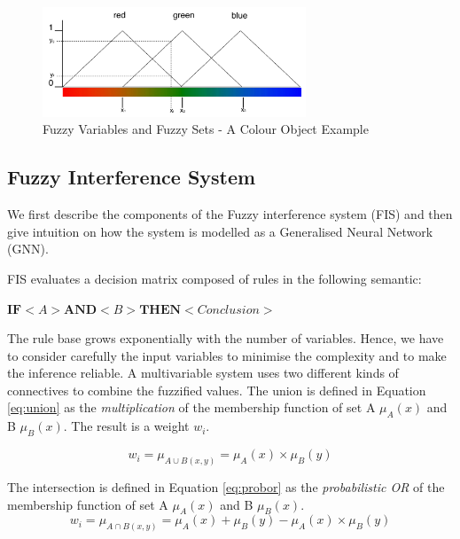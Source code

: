 \begin{figure}[H]
        \centering
         \includegraphics[width=0.7\textwidth ]{img/model/fuzz_example}
              
        \caption{Fuzzy Variables and Fuzzy Sets - A Colour Object Example}
        \label{fig:fuzz_example}
\end{figure}



\subsection{Fuzzy Interference System}

We first describe the components of the Fuzzy interference system (FIS) and then give intuition on how the system is modelled as a Generalised Neural Network (GNN). 

FIS evaluates a decision matrix composed of rules in the following semantic: \\

\centerline {$ \textbf{IF} <  A  > \textbf{AND} <  B  > \textbf{THEN} < Conclusion > $}

The rule base grows exponentially with the number of variables. Hence, we have to consider carefully the input variables to minimise the complexity and to make the inference reliable. A multivariable system uses two different kinds of connectives to combine the fuzzified values. The union is defined in Equation \ref{eq:union} as the \emph{multiplication} of the membership function of set A $\mu_A(x)$ and B $\mu_B(x).$ The result is a weight $w_i$.


 \begin{equation} \label{eq:union}
 w_i =  \mu_{A\cup B(x,y)} =   \mu_A (x) \times \mu_B(y)
 \end{equation}

The intersection is defined in Equation \ref{eq:probor} as the \emph{probabilistic OR} of the membership function of set A $\mu_A(x)$ and B $\mu_B(x).$ 
\begin{equation} \label{eq:probor}
 w_i =  \mu_{A\cap B(x,y)} =   \mu_A (x)  + \mu_B(y) -  \mu_A (x)  \times \mu_B(y)
 \end{equation}

